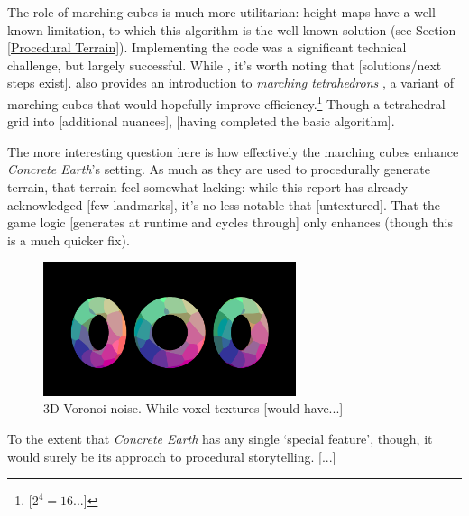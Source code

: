\documentclass[a4paper, 11pt]{article}
\begin{document}
\begin{flushleft}
\vspace{5pt}\noindent
The role of marching cubes is much more utilitarian: height maps have a well-known limitation, to which this algorithm is the well-known solution (see Section \ref{Procedural Terrain}). Implementing the code was a significant technical challenge, but largely successful. While , it's worth noting that [solutions/next steps exist]. \citeauthor{bourkeMarchingTetrahedrons} also provides an introduction to \textit{marching tetrahedrons} \citeyearpar{bourkeMarchingTetrahedrons}, a variant of marching cubes that would hopefully improve efficiency.\footnote{[$2^4 = 16$...]} %
Though a  tetrahedral grid into  [additional nuances], [having completed the basic algorithm]. %

\vspace{5pt}\noindent
The more interesting question here is how effectively the marching cubes enhance \textit{Concrete Earth}'s setting. As much as they are used to procedurally generate terrain, that terrain feel somewhat lacking: while this report has already acknowledged [few landmarks], it's no less notable that [untextured]. That the game logic [generates at runtime and cycles through] only enhances (though this is a much quicker fix).

\vspace{5pt}\noindent
\begin{figure}[h]
\centering
\includegraphics[width=0.66\textwidth]{Euclidean Voronoi Voxel}
\caption{3D Voronoi noise. While voxel textures [would have...]}
\label{Euclidean Voronoi Voxel}
\end{figure}

\vspace{5pt}\noindent
To the extent that \textit{Concrete Earth} has any single `special feature', though, it would surely be its approach to procedural storytelling. [...]


\end{flushleft}
\end{document}
